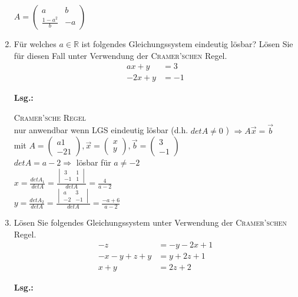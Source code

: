 \documentclass[12pt,a4paper]{scrreprt}
\newcommand{\R}{\mathds{R}}
\newcommand{\Lsg}{\textbf{Lsg.:}}
\begin{document}
\begin{enumerate}
$
A=\begin{pmatrix}
a & b \\
\frac{1-a^2}{b} & -a
\end{pmatrix}
$

	\item
Für welches $a \in \R$ ist folgendes Gleichungssystem eindeutig lösbar? Lösen Sie für diesen Fall unter Verwendung der \textsc{Cramer'schen} Regel.
\begin{align*}
		 ax + y & = 3 \\
		-2x + y & =-1
\end{align*}

\Lsg

\textsc{Cramer'sche Regel} \\
nur anwendbar wenn LGS eindeutig lösbar (d.h. $det A \neq 0$ ) $\Rightarrow A\vec{x}=\vec{b}$ \\
mit $A=\begin{pmatrix} a 1 \\ -2 1 \end{pmatrix}, \vec{x}=\begin{pmatrix} x \\ y \end{pmatrix}, \vec{b}=\begin{pmatrix} 3 \\ -1 \end{pmatrix}$ \\
$det A = a-2 \Rightarrow$ lösbar für $a \neq -2$ \\
$x= \frac{det A_1}{det A} = \frac{\begin{vmatrix} 3 & 1 \\ -1 & 1 \end{vmatrix}}{det A} = \frac{4}{a-2}$ \\
$y= \frac{det A_2}{det A} = \frac{\begin{vmatrix} a & 3 \\ -2 & -1 \end{vmatrix}}{det A} = \frac{-a+6}{a-2}$

\item 
Lösen Sie folgendes Gleichungssystem  unter Verwendung der \textsc{Cramer'schen} Regel.
	\begin{align*}
		-z			&= -y-2x+1 \\
		-x-y+z +y	&= y+2z+1 \\
		x+y			&= 2z+2
	\end{align*}

\Lsg

\begin{comment}
	\begin{align*}
	2x  +y  -z  & = 1 \\
	-x  -y  -z  & = 1 \\
	 x  +y  -2z & = 2 \\
	 \Rightarrow A=\begin{vmatrix}2 & 1 & -1 & 1 \\ -1 & -1 & -1 & 1 \\ 1 & 1 & -2 & 2\end{vmatrix} \\
	 det A = 4-1+1-(1-2+2) = 4-1 = 3
	\end{align*} 
\end{comment}


\end{enumerate}
\end{document}
